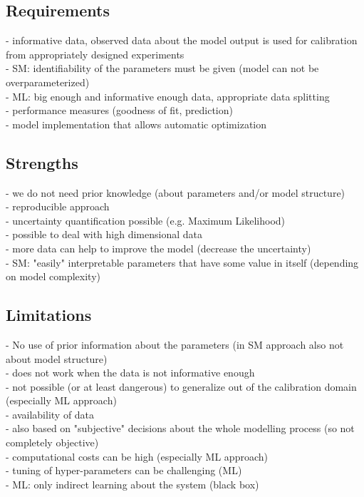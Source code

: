 \documentclass [english,11pt]{article} %
\begin{document}
\subsection*{Requirements}
- informative data, observed data about the model output is used for calibration from appropriately designed experiments\\
- SM: identifiability of the parameters must be given (model can not be overparameterized)\\
- ML: big enough and informative enough data, appropriate data splitting\\
- performance measures (goodness of fit, prediction)\\
- model implementation that allows automatic optimization\\

\subsection*{Strengths}

- we do not need prior knowledge (about parameters and/or model structure)\\
- reproducible approach\\
- uncertainty quantification possible (e.g. Maximum Likelihood)\\
- possible to deal with high dimensional data\\
- more data can help to improve the model (decrease the uncertainty)\\
- SM: "easily" interpretable parameters that have some value in itself (depending on model complexity)

\subsection*{Limitations}

- No use of prior information about the parameters (in SM approach also not about model structure)\\
- does not work when the data is not informative enough\\
- not possible (or at least dangerous) to generalize out of the calibration domain (especially ML approach)\\
- availability of data\\
- also based on "subjective" decisions about the whole modelling process (so not completely objective)\\
- computational costs can be high (especially ML approach)\\
- tuning of hyper-parameters can be challenging (ML)\\
- ML: only indirect learning about the system (black box)\\\\
\end{document}
